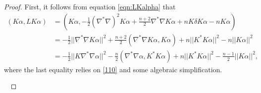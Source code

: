 \documentclass[10pt,a4paper]{amsart}
\begin{document}
\begin{proof}
First, it follows from equation \eqref{eqn:LKalpha} that
\begin{align}
 (K \alpha, L K\alpha) &= (K\alpha, -\frac{1}{2} (\nabla^* \nabla)^2 K\alpha + \frac{n+2}{2} \nabla^*\nabla K\alpha + n K \delta K\alpha -  n K\alpha) \nonumber \\
& = -\frac12 ||\nabla^*\nabla K\alpha||^2  + \frac{n+2}{2} (\nabla^*\nabla K\alpha, K\alpha) + n ||K^* K\alpha||^2 - n ||K\alpha||^2 \\ 
& = -\frac12 ||K \nabla^*\nabla \alpha||^2 - \frac{n}{2} ( \nabla^* \nabla \alpha, K^* K\alpha) + n ||K^* K\alpha||^2 - \frac{n-1}{2} ||K\alpha||^2,
\label{112} 
\end{align}
where the last equality relies on \eqref{110} and some algebraic simplification. 

\ 


\end{proof}
\end{document}
